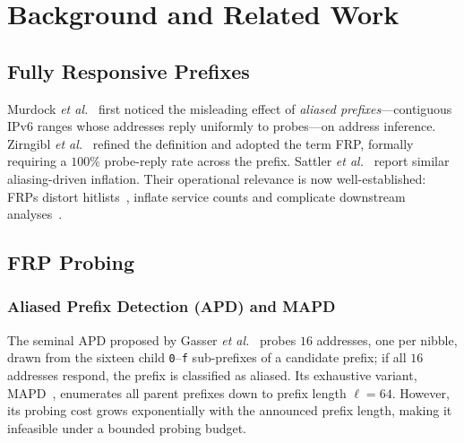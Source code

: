 \documentclass[conference]{IEEEtran}
\begin{document}
\section{Background and Related Work}\label{sec:background}

\subsection{Fully Responsive Prefixes}
Murdock \emph{et al.}~\cite{murdock2017tga} first noticed the
misleading effect of \emph{aliased prefixes}---contiguous IPv6
ranges whose addresses reply uniformly to probes---on address
inference.  Zirngibl \emph{et al.}~\cite{zirngibl2022rusty} refined
the definition and adopted the term FRP, formally requiring a
$100\%$ probe-reply rate across the prefix.  Sattler \emph{et
al.}~\cite{sattler2023hrp} report similar aliasing-driven inflation.
Their operational relevance is now well-established: FRPs distort
hitlists~\cite{gasser2018clusters,steger2023tga,plonka2015temporal},
inflate service counts and complicate downstream
analyses~\cite{erdemir2025aliases}.

\subsection{FRP Probing}
\label{sec:bg:probing}
\subsubsection{Aliased Prefix Detection (APD) and MAPD}
The seminal APD proposed by Gasser \emph{et al.}~\cite{gasser2018clusters}
probes $16$ addresses, one per nibble, drawn from the sixteen child
\texttt{0}--\texttt{f} sub-prefixes of a candidate prefix; if all $16$ addresses respond, the prefix is classified as aliased.  Its exhaustive variant,
MAPD~\cite{zirngibl2022rusty}, enumerates all parent prefixes down
to prefix length $\ell{=}64$. However, its probing cost grows exponentially with the announced
prefix length, making it infeasible under a bounded probing budget.
\end{document}
